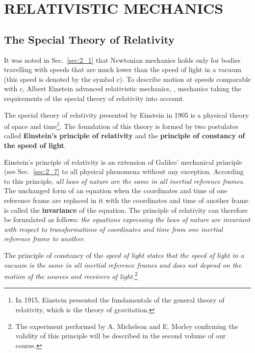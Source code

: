 

\chapter{RELATIVISTIC MECHANICS}\label{chap:8}

\section{The Special Theory of Relativity}\label{sec:8_1}

It was noted in Sec.~\ref{sec:2_1} that Newtonian mechanics holds only for bodies travelling with speeds that are much lower than the speed of light in a vacuum (this speed is denoted by the symbol $c$). To describe motion at speeds comparable with $c$, Albert Einstein advanced relativistic mechanics, \ie, mechanics taking the requirements of the special theory of relativity into account.

The special theory of relativity presented by Einstein in 1905 is a physical theory of space and time\footnote{In 1915, Einstein presented the fundamentals of the general theory of relativity, which is the theory of gravitation.}. The foundation of this theory is formed by two postulates called \textbf{Einstein's principle of relativity} and the \textbf{principle of constancy of the speed of light}. 

Einstein's principle of relativity is an extension of Galileo' mechanical principle (see Sec.~\ref{sec:2_7} to all physical phenomena without any exception. According to this principle, \textit{all laws of nature are the same in all inertial reference frames}. The unchanged form of an equation when the coordinates and time of one reference frame are replaced in it with the coordinates and time of another frame is called the \textbf{invariance} of the equation. The principle of relativity can therefore be formulated as follows: \textit{the equations expressing the laws of nature are invariant with respect to transformations of coordinates and time from one inertial reference frame to another}.

The principle of constancy of the \textit{speed of light states that the speed of light in a vacuum is the same in all inertial reference frames and does not depend on the motion of the sources and receivers of light}.\footnote{The experiment performed by A. Michelson and E. Morley confirming the validity of this principle will be described in the second volume of our course.}

